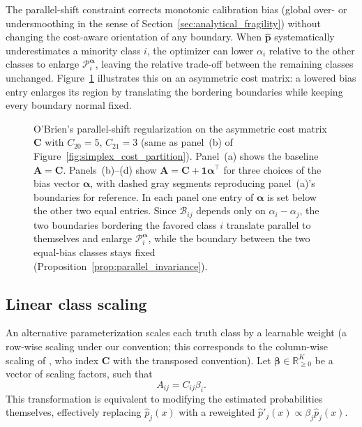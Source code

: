 The parallel-shift constraint corrects monotonic calibration bias (global over- or undersmoothing in the sense of Section~\ref{sec:analytical_fragility}) without changing the cost-aware orientation of any boundary. When $\hat{\mathbf{p}}$ systematically underestimates a minority class $i$, the optimizer can lower $\alpha_i$ relative to the other classes to enlarge $\mathcal{P}_i^{\boldsymbol{\alpha}}$, leaving the relative trade-off between the remaining classes unchanged. Figure~\ref{fig:obrien_parallel_shifts} illustrates this on an asymmetric cost matrix: a lowered bias entry enlarges its region by translating the bordering boundaries while keeping every boundary normal fixed.

\begin{figure}[H]
    \centering
    \resizebox{\textwidth}{!}{}
    \caption{O'Brien's parallel-shift regularization on the asymmetric cost matrix $\mathbf{C}$ with $C_{20}=5$, $C_{21}=3$ (same as panel~(b) of Figure~\ref{fig:simplex_cost_partition}). Panel~(a) shows the baseline $\mathbf{A}=\mathbf{C}$. Panels~(b)--(d) show $\mathbf{A}=\mathbf{C}+\mathbf{1}\boldsymbol{\alpha}^\top$ for three choices of the bias vector $\boldsymbol{\alpha}$, with dashed gray segments reproducing panel~(a)'s boundaries for reference. In each panel one entry of $\boldsymbol{\alpha}$ is set below the other two equal entries. Since $\mathcal{B}_{ij}$ depends only on $\alpha_i-\alpha_j$, the two boundaries bordering the favored class $i$ translate parallel to themselves and enlarge $\mathcal{P}_i^{\boldsymbol{\alpha}}$, while the boundary between the two equal-bias classes stays fixed (Proposition~\ref{prop:parallel_invariance}).}\label{fig:obrien_parallel_shifts}
\end{figure}

\subsection{Linear class scaling}\label{sec:linear_scaling}

An alternative parameterization scales each truth class by a learnable weight (a row-wise scaling under our convention; this corresponds to the column-wise scaling of \citet{obrien2008costsensitive}, who index $\mathbf{C}$ with the transposed convention). Let $\boldsymbol{\beta} \in \mathbb{R}^K_{\ge 0}$ be a vector of scaling factors, such that
\begin{equation}
    A_{ij} = C_{ij} \beta_i.
\end{equation}
This transformation is equivalent to modifying the estimated probabilities themselves, effectively replacing $\hat{p}_j(x)$ with a reweighted $\hat{p}'_j(x) \propto \beta_j \hat{p}_j(x)$.

